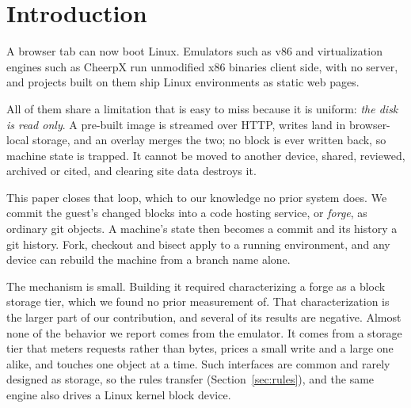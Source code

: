 \documentclass[journal,10pt]{IEEEtran}
\begin{document}
\section{Introduction}
\label{sec:intro}

A browser tab can now boot Linux. Emulators such as v86 and virtualization
engines such as CheerpX run unmodified x86 binaries client side, with no
server, and projects built on them ship Linux environments as static web pages.

All of them share a limitation that is easy to miss because it is uniform:
\emph{the disk is read only}. A pre-built image is streamed over HTTP, writes
land in browser-local storage, and an overlay merges the two; no block is ever
written back, so machine state is trapped. It cannot be moved to another device,
shared, reviewed, archived or cited, and clearing site data destroys it.

This paper closes that loop, which to our knowledge no prior system does. We
commit the guest's changed blocks into a code hosting service, or \emph{forge},
as ordinary git objects. A machine's state then becomes a commit and its
history a git history. Fork, checkout and bisect apply to a running environment,
and any device can rebuild the machine from a branch name alone.

The mechanism is small. Building it required characterizing a forge as a block
storage tier, which we found no prior measurement of. That characterization is
the larger part of our contribution, and several of its results are negative.
Almost none of the behavior we report comes from the emulator. It comes from a
storage tier that meters requests rather than bytes, prices a small write and a
large one alike, and touches one object at a time. Such interfaces are common
and rarely designed as storage, so the rules transfer
(Section~\ref{sec:rules}), and the same engine also drives a Linux kernel block
device.
\end{document}
